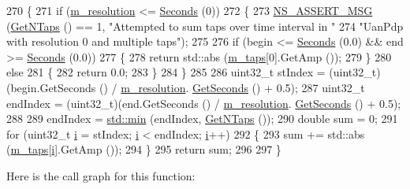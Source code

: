 \begin{DoxyCode}
270 \{
271   \textcolor{keywordflow}{if} (\hyperlink{classns3_1_1UanPdp_aac76e20be14850246e29cebc09468fa4}{m\_resolution} <= \hyperlink{group__timecivil_ga33c34b816f8ff6628e33d5c8e9713b9e}{Seconds} (0))
272     \{
273       \hyperlink{assert_8h_aff5ece9066c74e681e74999856f08539}{NS\_ASSERT\_MSG} (\hyperlink{classns3_1_1UanPdp_a2c8f126c0e33815d19505b55381f40f8}{GetNTaps} () == 1, \textcolor{stringliteral}{"Attempted to sum taps over time interval in "}
274                      \textcolor{stringliteral}{"UanPdp with resolution 0 and multiple taps"});
275 
276       \textcolor{keywordflow}{if} (begin <= \hyperlink{group__timecivil_ga33c34b816f8ff6628e33d5c8e9713b9e}{Seconds} (0.0) && end >= \hyperlink{group__timecivil_ga33c34b816f8ff6628e33d5c8e9713b9e}{Seconds} (0.0))
277         \{
278           \textcolor{keywordflow}{return} std::abs (\hyperlink{classns3_1_1UanPdp_a4b340fa551ee269c44dabe6ffb4546fb}{m\_taps}[0].GetAmp ());
279         \}
280       \textcolor{keywordflow}{else}
281         \{
282           \textcolor{keywordflow}{return} 0.0;
283         \}
284     \}
285 
286   uint32\_t stIndex = (uint32\_t)(begin.GetSeconds () / \hyperlink{classns3_1_1UanPdp_aac76e20be14850246e29cebc09468fa4}{m\_resolution}.
      \hyperlink{classns3_1_1Time_a8f20d5c3b0902d7b4320982f340b57c8}{GetSeconds} () + 0.5);
287   uint32\_t endIndex = (uint32\_t)(end.GetSeconds () / \hyperlink{classns3_1_1UanPdp_aac76e20be14850246e29cebc09468fa4}{m\_resolution}.
      \hyperlink{classns3_1_1Time_a8f20d5c3b0902d7b4320982f340b57c8}{GetSeconds} () + 0.5);
288 
289   endIndex = \hyperlink{80211b_8c_ac6afabdc09a49a433ee19d8a9486056d}{std::min} (endIndex, \hyperlink{classns3_1_1UanPdp_a2c8f126c0e33815d19505b55381f40f8}{GetNTaps} ());
290   \textcolor{keywordtype}{double} sum = 0;
291   \textcolor{keywordflow}{for} (uint32\_t \hyperlink{bernuolliDistribution_8m_a6f6ccfcf58b31cb6412107d9d5281426}{i} = stIndex; \hyperlink{bernuolliDistribution_8m_a6f6ccfcf58b31cb6412107d9d5281426}{i} < endIndex; \hyperlink{bernuolliDistribution_8m_a6f6ccfcf58b31cb6412107d9d5281426}{i}++)
292     \{
293       sum += std::abs (\hyperlink{classns3_1_1UanPdp_a4b340fa551ee269c44dabe6ffb4546fb}{m\_taps}[\hyperlink{bernuolliDistribution_8m_a6f6ccfcf58b31cb6412107d9d5281426}{i}].GetAmp ());
294     \}
295   \textcolor{keywordflow}{return} sum;
296 
297 \}
\end{DoxyCode}


Here is the call graph for this function\+:




